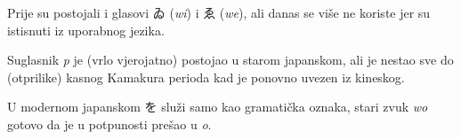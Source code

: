 	
	Prije su postojali i glasovi ゐ (\textit{wi}) i ゑ (\textit{we}), ali danas se više ne koriste jer su istisnuti iz uporabnog jezika.
	
	Suglasnik \textit{p} je (vrlo vjerojatno) postojao u starom japanskom, ali je nestao sve do (otprilike) kasnog Kamakura perioda kad je ponovno uvezen iz kineskog.
	
	U modernom japanskom を služi samo kao gramatička oznaka, stari zvuk \textit{wo} gotovo da je u potpunosti prešao u \textit{o}.
